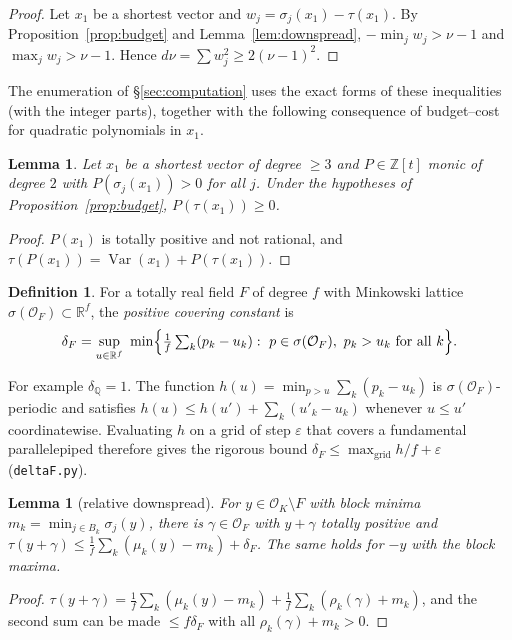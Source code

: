 \documentclass[11pt]{amsart}
\newtheorem{lemma}[theorem]{Lemma}
\theoremstyle{definition}
\newtheorem{definition}[theorem]{Definition}
\DeclareMathOperator{\Var}{Var}
\newcommand{\OK}{\mathcal{O}_K}
\newcommand{\OF}{\mathcal{O}_F}
\newcommand{\Q}{\mathbb{Q}}
\newcommand{\Z}{\mathbb{Z}}
\newcommand{\R}{\mathbb{R}}
\newcommand{\file}[1]{\texttt{#1}}
\begin{document}
\begin{proof}
Let $x_1$ be a shortest vector and $w_j=\sigma_j(x_1)-\tau(x_1)$.  By
Proposition~\ref{prop:budget} and Lemma~\ref{lem:downspread}, $-\min_jw_j>\nu-1$ and
$\max_jw_j>\nu-1$.  Hence $d\nu=\sum w_j^2\ge2(\nu-1)^2$.
\end{proof}

The enumeration of \S\ref{sec:computation} uses the exact forms of these inequalities (with
the integer parts), together with the following consequence of budget--cost for quadratic
polynomials in $x_1$.

\begin{lemma}\label{lem:quadfilter}
Let $x_1$ be a shortest vector of degree $\ge3$ and $P\in\Z[t]$ monic of degree $2$ with
$P(\sigma_j(x_1))>0$ for all $j$.  Under the hypotheses of Proposition~\ref{prop:budget},
$P(\tau(x_1))\ge0$.
\end{lemma}

\begin{proof}
$P(x_1)$ is totally positive and not rational, and $\tau(P(x_1))=\Var(x_1)+P(\tau(x_1))$.
\end{proof}

\begin{definition}
For a totally real field $F$ of degree $f$ with Minkowski lattice $\sigma(\OF)\subset\R^f$,
the \emph{positive covering constant} is
\[
\delta_F=\sup_{u\in\R^f}\ \min\Bigl\{\tfrac1f\textstyle\sum_k(p_k-u_k):\ p\in\sigma(\OF),\
p_k>u_k\ \text{for all }k\Bigr\}.
\]
\end{definition}

For example $\delta_\Q=1$.  The function $h(u)=\min_{p>u}\sum_k(p_k-u_k)$ is
$\sigma(\OF)$-periodic and satisfies $h(u)\le h(u')+\sum_k(u'_k-u_k)$ whenever $u\le u'$
coordinatewise.  Evaluating $h$ on a grid of step $\varepsilon$ that covers a fundamental
parallelepiped therefore gives the rigorous bound $\delta_F\le\max_{\mathrm{grid}}h/f+\varepsilon$
(\file{deltaF.py}).

\begin{lemma}[relative downspread]\label{lem:reldown}
For $y\in\OK\setminus F$ with block minima $m_k=\min_{j\in B_k}\sigma_j(y)$, there is
$\gamma\in\OF$ with $y+\gamma$ totally positive and
$\tau(y+\gamma)\le\frac1f\sum_k(\mu_k(y)-m_k)+\delta_F$.  The same holds for $-y$ with the
block maxima.
\end{lemma}

\begin{proof}
$\tau(y+\gamma)=\frac1f\sum_k(\mu_k(y)-m_k)+\frac1f\sum_k(\rho_k(\gamma)+m_k)$, and the second
sum can be made $\le f\delta_F$ with all $\rho_k(\gamma)+m_k>0$.
\end{proof}
\end{document}
